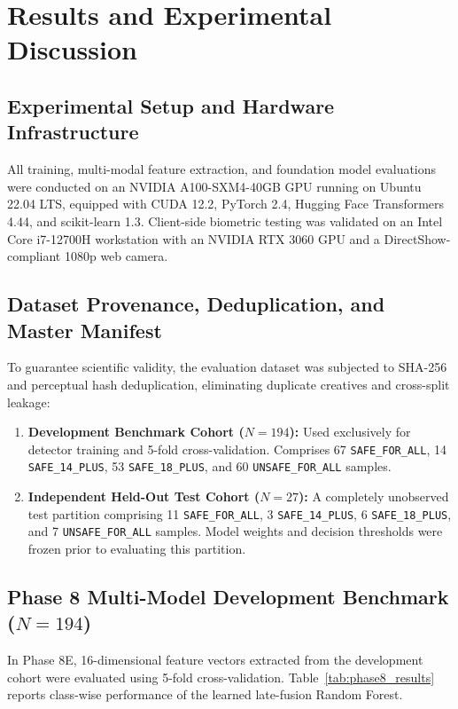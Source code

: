 \documentclass[12pt,a4paper]{report}
\begin{document}
\chapter{Results and Experimental Discussion}
\label{ch:results}

\section{Experimental Setup and Hardware Infrastructure}
All training, multi-modal feature extraction, and foundation model evaluations were conducted on an NVIDIA A100-SXM4-40GB GPU running on Ubuntu 22.04 LTS, equipped with CUDA 12.2, PyTorch 2.4, Hugging Face Transformers 4.44, and scikit-learn 1.3. Client-side biometric testing was validated on an Intel Core i7-12700H workstation with an NVIDIA RTX 3060 GPU and a DirectShow-compliant 1080p web camera.

\section{Dataset Provenance, Deduplication, and Master Manifest}
To guarantee scientific validity, the evaluation dataset was subjected to SHA-256 and perceptual hash deduplication, eliminating duplicate creatives and cross-split leakage:
\begin{enumerate}
    \item \textbf{Development Benchmark Cohort ($N=194$):} Used exclusively for detector training and 5-fold cross-validation. Comprises 67 \texttt{SAFE\_FOR\_ALL}, 14 \texttt{SAFE\_14\_PLUS}, 53 \texttt{SAFE\_18\_PLUS}, and 60 \texttt{UNSAFE\_FOR\_ALL} samples.
    \item \textbf{Independent Held-Out Test Cohort ($N=27$):} A completely unobserved test partition comprising 11 \texttt{SAFE\_FOR\_ALL}, 3 \texttt{SAFE\_14\_PLUS}, 6 \texttt{SAFE\_18\_PLUS}, and 7 \texttt{UNSAFE\_FOR\_ALL} samples. Model weights and decision thresholds were frozen prior to evaluating this partition.
\end{enumerate}

\section{Phase 8 Multi-Model Development Benchmark ($N=194$)}
In Phase 8E, 16-dimensional feature vectors extracted from the development cohort were evaluated using 5-fold cross-validation. Table~\ref{tab:phase8_results} reports class-wise performance of the learned late-fusion Random Forest.
\end{document}
